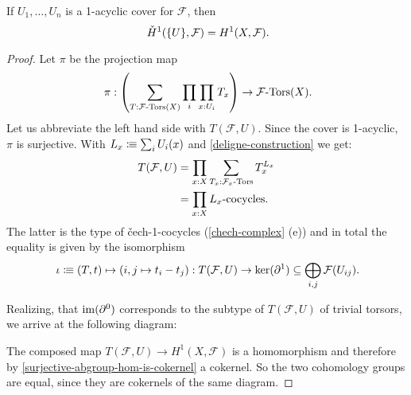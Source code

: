 \begin{theorem}%
  If $U_1,\dots,U_n$ is a 1-acyclic cover for $\mathcal F$, then
  \[
    \check{H}^1(\{U\},\mathcal F)=H^1(X,\mathcal F)\rlap{.}
  \]
\end{theorem}

\begin{proof}
  Let $\pi$ be the projection map
  \[
    \pi :
    \left(
      \sum_{T:\Tors{\mathcal F}(X)}\prod_{i}\prod_{x:U_i}T_x
    \right)
    \to \Tors{\mathcal F}(X)\rlap{.}
  \]
  Let us abbreviate the left hand side with $T(\mathcal F,U)$.
  Since the cover is 1-acyclic, $\pi$ is surjective.
  With $L_x\vcentcolon\mspace{-1.2mu}\equiv \sum_{i}U_i(x)$ and \cref{deligne-construction} we get:
  \begin{align*}
    T(\mathcal F,U)&=\prod_{x:X}\sum_{T_x:\Tors{\mathcal F_x}}T_x^{L_x} \\
                   &=\prod_{x:X}\text{$L_x$-cocycles}
                     \rlap{.}
  \end{align*}
  The latter is the type of \v{c}ech-1-cocycles (\cref{chech-complex} (e))
  and in total the equality is given by the isomorphism
  \[
    \iota \colonequiv
    (T,t) \mapsto (i,j\mapsto t_i - t_j) :
    T(\mathcal F,U)
    \to
    \ker(\partial^1)
    \subseteq
    \bigoplus_{i,j}\mathcal F(U_{ij})\rlap{.}
  \]

  Realizing, that $\operatorname{im}(\partial^0)$ corresponds to the subtype of $T(\mathcal F,U)$ of trivial torsors,
  we arrive at the following diagram:
  \begin{center}
  \end{center}
  The composed map $T(\mathcal F,U)\to H^1(X,\mathcal F)$ is a homomorphism
  and therefore by \cref{surjective-abgroup-hom-is-cokernel} a cokernel.
  So the two cohomology groups are equal, since they are cokernels of the same diagram.
\end{proof}
